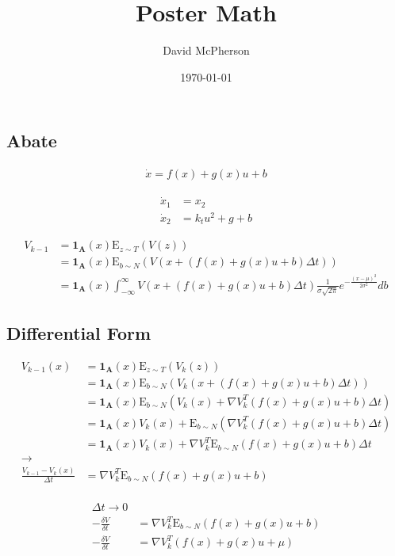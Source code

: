 \documentclass[a4paper]{article}
\title{Poster Math}
\author{David McPherson}
\date{\today}
\begin{document}
  \subsection{Abate}

  \begin{align*}
  \dot{x} = f(x) + g(x) u + b
  \end{align*}

  \begin{align*}
  \dot{x}_1 &= x_2
  \\
  \dot{x}_2 &= k_t u^2 + g + b
  \end{align*}

  \begin{align*}
  V_{k-1} & = \mathbf{1_A}(x) \mathrm{E}_{z \sim T} (V(z))
  \\ & = \mathbf{1_A}(x) \mathrm{E}_{b\sim N} (V( x + (f(x) + g(x) u + b) \Delta t) )
  \\ & = \mathbf{1_A}(x) \int_{-\infty}^{\infty} V( x + (f(x) + g(x) u + b) \Delta t) \frac{1}{\sigma \sqrt{2 \pi}} e^{-\frac{(x-\mu)^2}{2 \sigma^2}} db
  \end{align*}

  \subsection{Differential Form}

  \begin{align*}
  V_{k-1}(x) & = \mathbf{1_A}(x) \mathrm{E}_{z \sim T} (V_k(z))
  \\ & = \mathbf{1_A}(x) \mathrm{E}_{b\sim N} (V_k( x + (f(x) + g(x) u + b) \Delta t) )
  \\ & = \mathbf{1_A}(x) \mathrm{E}_{b\sim N} (V_k( x ) + \nabla V_k^T (f(x) + g(x) u + b) \Delta t )
  \\ & = \mathbf{1_A}(x) V_k(x) + \mathrm{E}_{b\sim N} ( \nabla V_k^T (f(x) + g(x) u + b) \Delta t )
  \\ & = \mathbf{1_A}(x) V_k(x) + \nabla V_k^T \mathrm{E}_{b\sim N} ( f(x) + g(x) u + b ) \Delta t
  \\ \rightarrow
  \\ \frac{V_{k-1} - V_k(x)}{\Delta t} &= \nabla V_k^T \mathrm{E}_{b\sim N} ( f(x) + g(x) u + b )
  \end{align*}

  \begin{align*}
  \\ \Delta t \rightarrow 0
  \\ -\frac{\delta V}{\delta t} &= \nabla V_k^T \mathrm{E}_{b\sim N} ( f(x) + g(x) u + b )
  \\ -\frac{\delta V}{\delta t} &= \nabla V_k^T ( f(x) + g(x) u + \mu )
  \end{align*}
\end{document}
